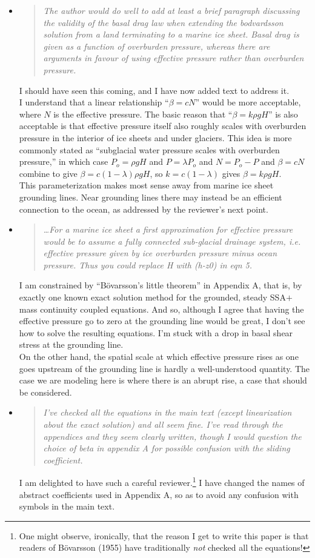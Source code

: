 \documentclass[11pt,reqno]{amsart}
\renewcommand{\dh}{\fontencoding{T1}\selectfont{\symbol{240}}}
\newcommand{\bod}{B\"o\dh varsson\xspace}
\newcommand{\citebod}{B\"o\dh varsson (1955)\nocite{Bodvardsson}\xspace}
\newcommand{\reply}[2]{
\medskip\medskip
\item  \begin{quote}
\emph{#1}
\end{quote}

\medskip
\noindent #2}
\begin{document}
\begin{itemize}
\reply{The author would do well to add at least a brief paragraph discussing the validity of the basal drag law when extending the bodvardsson solution from a land terminating to a marine ice sheet.  Basal drag is given as a function of overburden pressure, whereas there are arguments in favour of using effective pressure rather than overburden pressure.}
{I should have seen this coming, and I have now added text to address it. \medskip \\
I understand that a linear relationship ``$\beta = c N$'' would be more acceptable, where $N$ is the effective pressure.  The basic reason that ``$\beta = k \rho g H$'' is also acceptable is that effective pressure itself also roughly scales with overburden pressure in the interior of ice sheets and under glaciers.  This idea is more commonly stated as ``subglacial water pressure scales with overburden pressure,'' in which case $P_o = \rho g H$ and $P=\lambda P_o$ and $N=P_o - P$ and $\beta = c N$ combine to give $\beta = c (1 - \lambda) \rho g H$, so $k=c(1-\lambda)$ gives $\beta = k \rho g H$.
\medskip \\
This parameterization makes most sense away from marine ice sheet grounding lines.  Near grounding lines there may instead be an efficient connection to the ocean, as addressed by the reviewer's next point.}

\reply{\dots For a marine ice sheet a first approximation for effective pressure would be to assume a fully connected sub-glacial drainage system, i.e. effective pressure given by ice overburden pressure minus ocean pressure. Thus you could replace H with (h-z0) in eqn 5.}
{I am constrained by ``\bod's little theorem'' in Appendix A, that is, by exactly one known exact solution method for the grounded, steady SSA$+$mass continuity coupled equations.  And so, although I agree that having the effective pressure go to zero at the grounding line would be great, I don't see how to solve the resulting equations.  I'm stuck with a drop in basal shear stress at the grounding line. \medskip \\
On the other hand, the spatial scale at which effective pressure rises as one goes upstream of the grounding line is hardly a well-understood quantity.  The case we are modeling here is where there is an abrupt rise, a case that should be considered.}

\reply{I've checked all the equations in the main text (except linearization about the exact solution) and all seem fine. I've read through the appendices and they seem clearly written, though I would question the choice of beta in appendix A for possible confusion with the sliding coefficient.}
{I am delighted to have such a careful reviewer.\footnote{One might observe, ironically, that the reason I get to write this paper is that readers of \citebod have traditionally \emph{not} checked all the equations!}  I have changed the names of abstract coefficients used in Appendix A, so as to avoid any confusion with symbols in the main text.}


\end{itemize}
\end{document}
